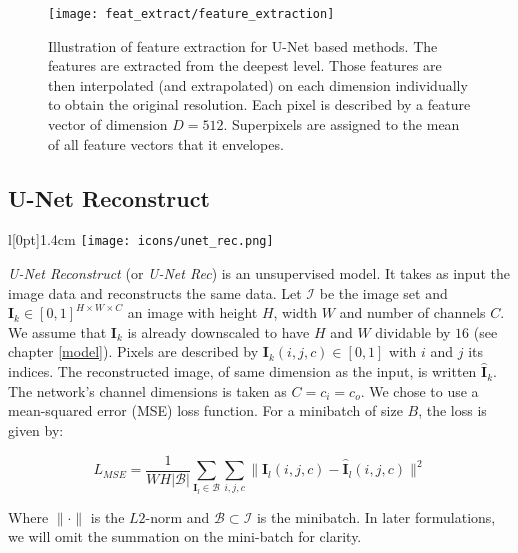 \begin{figure}[htbp]
  \centering
  \texttt{[image: feat\_extract/feature\_extraction]}
  \caption[Feature extraction model]{Illustration of feature extraction for U-Net based methods. The features are extracted from the deepest level. Those features are then interpolated (and extrapolated) on each dimension individually to obtain the original resolution. Each pixel is described by a feature vector of dimension $D=512$.
    Superpixels are assigned to the mean of all feature vectors that it envelopes.}
  \label{fig:feat_extract}
\end{figure}

\subsection{U-Net Reconstruct}
\begingroup
\setlength\intextsep{0pt}
\begin{wrapfigure}[4]{l}[0pt]{1.4cm}
\texttt{[image: icons/unet\_rec.png]}
\end{wrapfigure}

\textit{U-Net Reconstruct} (or \textit{U-Net Rec}) is an unsupervised model. It takes as input the image data and reconstructs the same data. Let $\mathcal{I}$ be the image set and $\boldsymbol{I}_k \in [0,1]^{H \times W \times C}$ an image with height $H$, width $W$ and number of channels $C$. We assume that $\boldsymbol{I}_k$ is already downscaled to have $H$ and $W$ dividable by $16$ (see chapter \ref{model}). Pixels are described by $\boldsymbol{I}_k(i,j,c) \in [0,1]$ with $i$ and $j$ its indices. The reconstructed image, of same dimension as the input, is written $\boldsymbol{\hat{I}}_k$. The network's channel dimensions is taken as $C = c_i = c_o$. We chose to use a mean-squared error (MSE) loss function. For a minibatch of size $B$, the loss is given by:

\endgroup
\vspace{6pt}

\begin{equation}
L_{MSE} = \frac{1}{W H |\mathcal{B}|} \sum_{\boldsymbol{I}_l \in \mathcal{B}} \sum_{i,j,c} \|\boldsymbol{I}_l(i,j,c) - \boldsymbol{\hat{I}}_l(i,j,c)\|^2
\label{eq:mse_loss}
\end{equation}
\vspace{6pt}

Where $\| \cdot \|$ is the $L2$-norm and $\mathcal{B} \subset \mathcal{I}$ is the minibatch.
In later formulations, we will omit the summation on the mini-batch for clarity.

